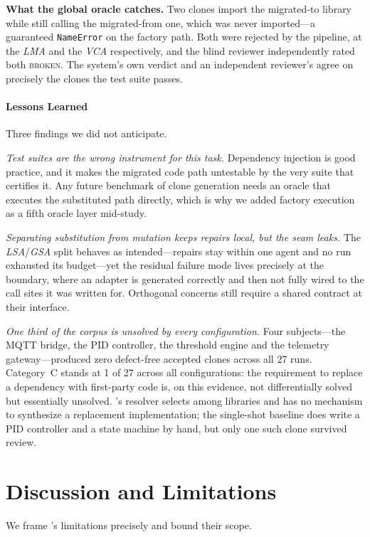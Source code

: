 \textbf{What the global oracle catches.} Two \sys clones import the migrated-to library while still calling the migrated-from one, which was never imported---a guaranteed \texttt{NameError} on the factory path. Both were rejected by the pipeline, at the \emph{LMA} and the \emph{VCA} respectively, and the blind reviewer independently rated both \textsc{broken}. The system's own verdict and an independent reviewer's agree on precisely the clones the test suite passes.

\paragraph{Lessons Learned}
Three findings we did not anticipate.

\emph{Test suites are the wrong instrument for this task.} Dependency injection is good practice, and it makes the migrated code path untestable by the very suite that certifies it. Any future benchmark of clone generation needs an oracle that executes the substituted path directly, which is why we added factory execution as a fifth oracle layer mid-study.

\emph{Separating substitution from mutation keeps repairs local, but the seam leaks.} The \emph{LSA}/\emph{GSA} split behaves as intended---repairs stay within one agent and no run exhausted its budget---yet the residual failure mode lives precisely at the boundary, where an adapter is generated correctly and then not fully wired to the call sites it was written for. Orthogonal concerns still require a shared contract at their interface.

\emph{One third of the corpus is unsolved by every configuration.} Four subjects---the MQTT bridge, the PID controller, the threshold engine and the telemetry gateway---produced zero defect-free accepted clones across all 27 runs. Category~C stands at 1 of 27 across all configurations: the requirement to replace a dependency with first-party code is, on this evidence, not differentially solved but essentially unsolved. \sys's resolver selects among libraries and has no mechanism to synthesize a replacement implementation; the single-shot baseline does write a PID controller and a state machine by hand, but only one such clone survived review.

\section{Discussion and Limitations}

We frame \sys's limitations precisely and bound their scope.

